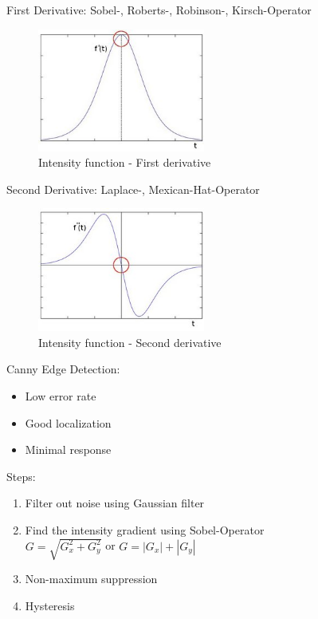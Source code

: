 \documentclass{beamer}
\begin{document}
\begin{frame}
	\begin{block}{First Derivative:}
		Sobel-, Roberts-, Robinson-, Kirsch-Operator 
	\end{block}
	\begin{figure} 
		\includegraphics[width=0.49\textwidth]{edge4.jpg}
		\caption{Intensity function - First derivative} 
	\end{figure}
\end{frame}

\begin{frame}
	\begin{block}{Second Derivative:}
	Laplace-, Mexican-Hat-Operator 
	\end{block}
	\begin{figure} 
		\includegraphics[width=0.49\textwidth]{edge5.jpg}
		\caption{Intensity function - Second derivative} 
	\end{figure}
\end{frame}

\begin{frame}
	\begin{block}{Canny Edge Detection:}
		\begin{itemize}
			\item Low error rate
			\item Good localization
			\item Minimal response
		\end{itemize}
	\end{block}
\end{frame}

\begin{frame}
	\begin{block}{Steps:}
		\begin{enumerate}
			\item Filter out noise using Gaussian filter
			\item Find the intensity gradient using Sobel-Operator\\
			$G = \sqrt{G_x^2 + G_y^2}$ or  $G = |G_x| + |G_y|$
			\item Non-maximum suppression
			\item Hysteresis
		\end{enumerate}
	\end{block}
\end{frame}
\end{document}
